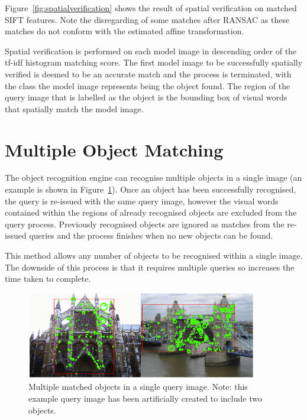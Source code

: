 \documentclass[11pt, onecolumn, a4paper, final]{report} %
\begin{document}
Figure~\ref{fig:spatialverification} shows the result of spatial verification on matched SIFT features. Note the disregarding of some matches after RANSAC as these matches do not conform with the estimated affine transformation.

Spatial verification is performed on each model image in descending order of the tf-idf histogram matching score. The first model image to be successfully spatially verified is deemed to be an accurate match and the process is terminated, with the class the model image represents being the object found. The region of the query image that is labelled as the object is the bounding box of visual words that spatially match the model image.


\section{Multiple Object Matching}
\label{sec:multiobject}
The object recognition engine can recognise multiple objects in a single image (an example is shown in Figure~\ref{fig:multiplematching}). Once an object has been successfully recognised, the query is re-issued with the same query image, however the visual words contained within the regions of already recognised objects are excluded from the query process. Previously recognised objects are ignored as matches from the re-issued queries and the process finishes when no new objects can be found. 

This method allows any number of objects to be recognised within a single image. The downside of this process is that it requires multiple queries so increases the time taken to complete.

\begin{figure}[htb]
\centering 
\includegraphics[width=0.9\textwidth]{images/multimatch.png}
\caption{Multiple matched objects in a single query image. Note: this example query image has been artificially created to include two objects.}
\label{fig:multiplematching}
\end{figure}
\end{document}
